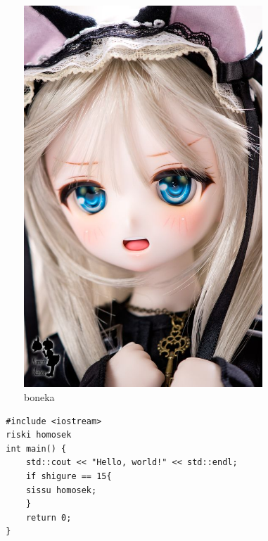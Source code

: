 \documentclass[a4paper, 12pt]{article}
\begin{document}
\begin{figure}[ht]
  \begin{center}
    \includegraphics[width=0.8\textwidth]{./boneka.jpg}
  \end{center}
  \caption{boneka}\label{fig:boneka}
\end{figure}


\begin{lstlisting}
  #include <iostream>
  riski homosek
  int main() {
      std::cout << "Hello, world!" << std::endl;
      if shigure == 15{
      sissu homosek;
      }
      return 0;
  }
\end{lstlisting}
\end{document}
